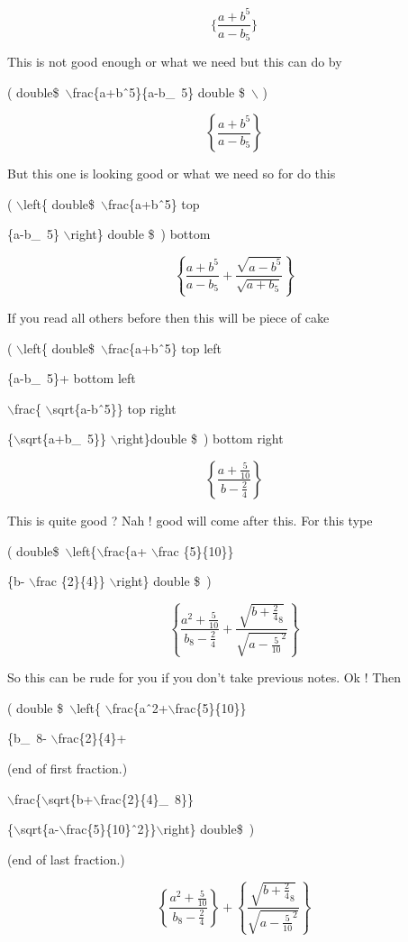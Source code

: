 \documentclass[11pt]{article}
\begin{document}
$$\{\frac{a+b^5}{a-b_5}\}$$

This is not good enough or what we need but this can do by

( double\$\ $\backslash$frac\{a+b\^\ 5\}\{a-b\_\ 5\} double \$\ $\backslash$ )

$$\left\{\frac{a+b^5}{a-b_5}\right\}$$

But this one is looking good or what we need so for do this

( $\backslash$left\{ double\$\ $\backslash$frac\{a+b\^\ 5\} top

\{a-b\_\ 5\}  $\backslash$right\} double \$\ ) bottom

$$ \left\{ \frac{a+b^5}{a-b_5} + \frac{\sqrt{a-b^5}}{\sqrt{a+b_5}}  \right\}$$

If you read all others before then this will be piece of cake


( $\backslash$left\{ double\$\ $\backslash$frac\{a+b\^\ 5\} top left

\{a-b\_\ 5\}+ bottom left 

$\backslash$frac\{ $\backslash$sqrt\{a-b\^\ 5\}\} top right

\{$\backslash$sqrt\{a+b\_\ 5\}\} $\backslash$right\}double \$\ ) bottom right

$$\left\{\frac{a+\frac{5}{10}}{b-\frac{2}{4}}\right\}$$

This is quite good ? Nah ! good will come after this. For this type 

( double\$\ $\backslash$left\{$\backslash$frac\{a+ $\backslash$frac \{5\}\{10\}\}

\{b- $\backslash$frac \{2\}\{4\}\} $\backslash$right\} double \$\ )

$$\left\{\frac{a^2+\frac{5}{10}}{b_8-\frac{2}{4}}+  \frac{\sqrt{b+\frac{2}{4}_8}}
{\sqrt{a-\frac{5}{10}^2}}  \right\}$$

So this can be rude for you if you don't take previous notes. Ok ! Then

( double \$\ $\backslash$left\{ $\backslash$frac\{a\^\ 2+$\backslash$frac\{5\}\{10\}\}

\{b\_\ 8- $\backslash$frac\{2\}\{4\}+ 

(end of first fraction.)

$\backslash$frac\{$\backslash$sqrt\{b+$\backslash$frac\{2\}\{4\}\_\ 8\}\}

\{$\backslash$sqrt\{a-$\backslash$frac\{5\}\{10\}\^\ 2\}\}$\backslash$right\} double\$\ )

(end of last fraction.)

$$\left\{\frac{a^2+\frac{5}{10}}{b_8-\frac{2}{4}}  \right\} + \left\{  \frac{\sqrt{b+\frac{2}{4}_8}}{\sqrt{a-\frac{5}{10}^2}}  \right\}$$
\end{document}
